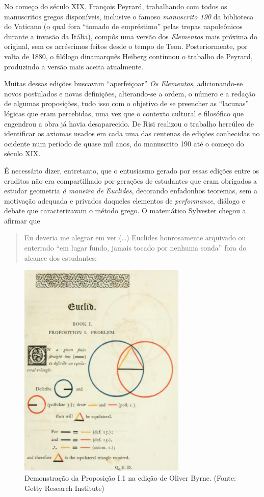 \documentclass{hipatia}
\begin{document}
No começo do século XIX, François Peyrard, trabalhando
com todos os manuscritos gregos disponíveis, inclusive
o famoso \emph{manuscrito 190} da biblioteca do 
Vaticano (o qual fora ``tomado de empréstimo'' 
pelas tropas napoleônicos durante a invasão da
Itália), compôs uma versão dos \emph{Elementos}
mais próxima do original, sem os acréscimos 
feitos desde o tempo de Teon. Posteriormente, 
por volta de 1880, 
o filólogo dinamarquês Heiberg continuou o trabalho
de Peyrard, produzindo a versão mais aceita
atualmente.

Muitas dessas edições buscavam ``aperfeiçoar'' 
\emph{Os Elementos}, adicionando-se novos 
postulados e novas definições, alterando-se a 
ordem, o número e a redação de algumas proposições,
tudo isso com o objetivo de se preencher as ``lacunas''
lógicas que eram percebidas, uma vez que 
o contexto cultural e filosófico que 
engendrou a obra já havia desaparecido.
De Risi \cite{derisi2016} realizou o trabalho
hercúleo de identificar os axiomas usados 
em cada uma das centenas de edições conhecidas
no ocidente num período de quase mil anos,
do manuscrito 190 até o começo do século XIX.

É necessário dizer, entretanto, que  
o entusiasmo gerado por essas edições
entre os eruditos 
não era compartilhado por gerações de
estudantes que eram obrigados a estudar
geometria \emph{à maneira de Euclides},
decorando enfadonhos teoremas, sem 
a motivação adequada e privados
daqueles elementos de \emph{performance},
diálogo e debate que caracterizavam o
método grego. 
O matemático Sylvester chegou a afirmar 
que 
\begin{quote}
Eu deveria me alegrar em ver (\dots) 
Euclides honrosamente arquivado ou enterrado 
``em lugar fundo, jamais tocado por nenhuma sonda''
fora do alcance dos estudantes; \cite[p. 286]{Wardhaugh2021}
\end{quote}

\begin{figure}[htb!]
\begin{center}
\includegraphics[width=8cm]{byrne.png}
\end{center}
\caption{\label{fig:Byrne}
Demonstração da Proposição I.1 na edição de Oliver Byrne.
(Fonte: Getty Research Institute)}   
\end{figure}
\end{document}
